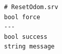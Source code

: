 \documentclass[preview,border=2pt]{standalone}
\begin{document}
\begin{lstlisting}[style=textstyle]
# ResetOdom.srv
bool force
---
bool success
string message
\end{lstlisting}
\end{document}

